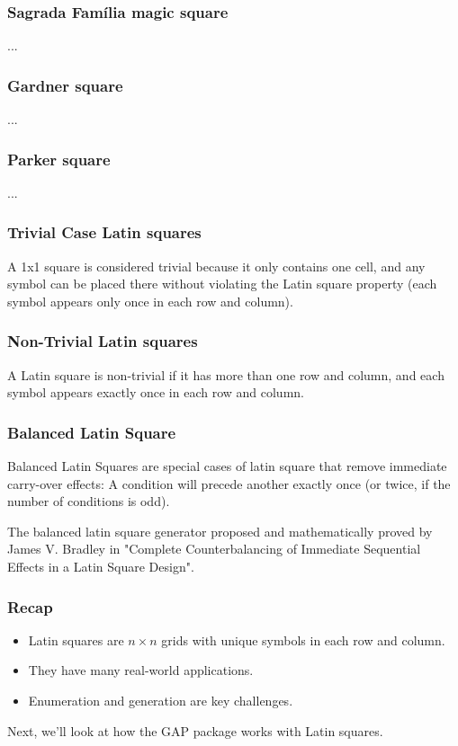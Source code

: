\documentclass{beamer}
\begin{document}
\begin{frame}
\begin{frame}
\frametitle{Sagrada Família magic square}
...
\end{frame}

\begin{frame}
\frametitle{Gardner square}
...
\end{frame}

\begin{frame}
\frametitle{Parker square}
...
\end{frame}

\begin{frame}
\frametitle{Trivial Case Latin squares}
A 1x1 square is considered trivial because it only contains one cell, and any symbol can be placed there without violating the Latin square property (each symbol appears only once in each row and column).
\end{frame}

\begin{frame}
\frametitle{Non-Trivial Latin squares}
A Latin square is non-trivial if it has more than one row and column, and each symbol appears exactly once in each row and column.
\end{frame}


\begin{frame}
\frametitle{Balanced Latin Square}
Balanced Latin Squares are special cases of latin square that remove immediate carry-over effects: A condition will precede another exactly once (or twice, if the number of conditions is odd).

The balanced latin square generator proposed and mathematically proved by James V. Bradley in "Complete Counterbalancing of Immediate Sequential Effects in a Latin Square Design".
\end{frame}

\begin{frame}
\frametitle{Recap}
\begin{itemize}
  \item Latin squares are $n \times n$ grids with unique symbols in each row and column.
  \item They have many real-world applications.
  \item Enumeration and generation are key challenges.
\end{itemize}
Next, we'll look at how the GAP package works with Latin squares.
\end{frame}


\end{frame}
\end{document}
